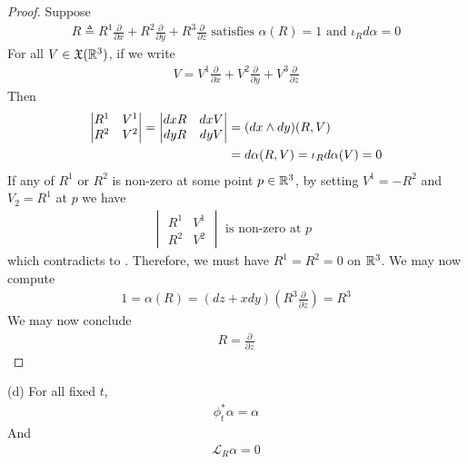 \documentclass{report}
\begin{document}
\begin{proof}
Suppose 
\begin{align*}
R\triangleq R^1 \frac{\partial }{\partial x}+ R^2 \frac{\partial }{\partial y}+ R^3 \frac{\partial }{\partial z}\text{ satisfies }\alpha (R)=1 \text{ and }\iota_R d\alpha =0 
\end{align*}
For all $V \in \mathfrak{X}(\mathbb{R}^3)$, if we write 
\begin{align*}
V=V^1 \frac{\partial }{\partial x}+ V^2 \frac{\partial }{\partial y}+ V^3 \frac{\partial }{\partial z}
\end{align*}
Then 
\begin{align}
\label{sg}
\begin{vmatrix} 
  R^1 & V^1 \\
  R^2 & V^2
\end{vmatrix}=\begin{vmatrix} 
  dx R & dx V\\
  dy R & dy V
\end{vmatrix}&= (dx \wedge  dy)(R,V) \\
&=d\alpha (R,V)=\iota_R d\alpha (V)  =0 \notag 
\end{align}
If any of $R^1$ or $R^2$ is non-zero at some point $p \in\mathbb{R}^3$, by setting $V^1=-R^2$ and $V_2=R^1$ at  $p$ we have   
\begin{align*}
\begin{vmatrix} 
  R^1 & V^1 \\
  R^2 & V^2 
\end{vmatrix}\text{ is non-zero at $p$ }
\end{align*}
which contradicts to . Therefore, we must have $R^1=R^2=0$ on  $\mathbb{R}^3$. We may now compute 
 \begin{align*}
1=\alpha (R)= (dz+xdy) (R^3 \frac{\partial }{\partial z})= R^3
\end{align*}
We may now conclude 
\begin{align*}
  R=  \frac{\partial }{\partial z}
\end{align*}

\end{proof}
\begin{theorem}
  (d) For all fixed $t$, 
\begin{align*}
\phi_t^* \alpha = \alpha 
\end{align*}
And 
\begin{align*}
\mathcal{L}_R \alpha =0
\end{align*}
\end{theorem}
\end{document}
